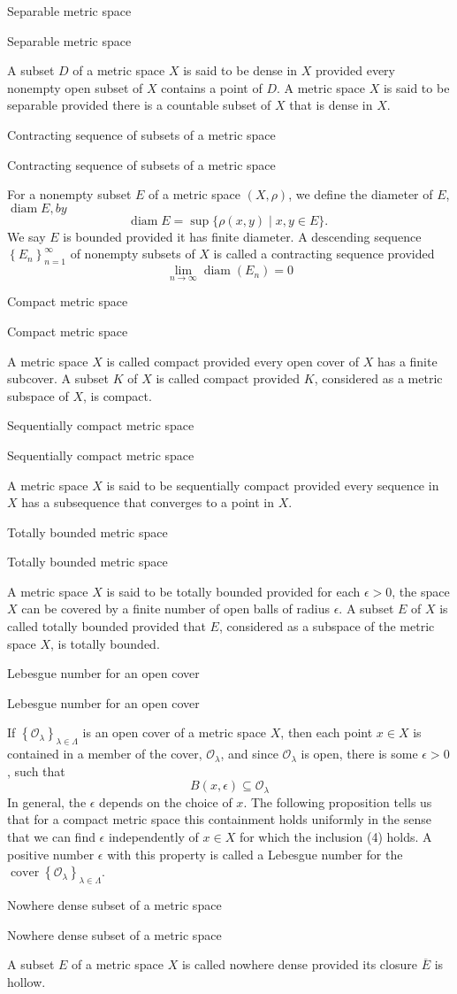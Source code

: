 \documentclass[17pt]{extarticle}
\renewcommand{\bar}[1]{\overline{#1}}
\newcommand{\boxset}[2]{\begin{mdframed}[style=darkQuesion]
#1
\end{mdframed}
\newpage
\begin{mdframed}[style=darkQuesion]
#1
  \end{mdframed}
\begin{mdframed}[style=darkAnswer]
#2
  \end{mdframed}
  \newpage
}
\begin{document}
\boxset{Separable metric space}
{
A subset $D$ of a metric space $X$ is said to be dense in $X$ provided every nonempty open subset of $X$ contains a point of $D$. A metric space $X$ is said to be separable provided there is a countable subset of $X$ that is dense in $X$.
}
\boxset{Contracting sequence of subsets of a metric space}
{
For a nonempty subset $E$ of a metric space $(X, \rho)$, we define the diameter of $E$, $\operatorname{diam} E, b y$
$$
\operatorname{diam} E=\sup \{\rho(x, y) \mid x, y \in E\} \text {. }
$$
We say $E$ is bounded provided it has finite diameter. A descending sequence $\left\{E_{n}\right\}_{n=1}^{\infty}$ of nonempty subsets of $X$ is called a contracting sequence provided
$$
\lim _{n \rightarrow \infty} \operatorname{diam}\left(E_{n}\right)=0
$$
}
\boxset{Compact metric space}
{
A metric space $X$ is called compact provided every open cover of $X$ has a finite subcover. A subset $K$ of $X$ is called compact provided $K$, considered as a metric subspace of $X$, is compact.
}
\boxset{Sequentially compact metric space}
{
A metric space $X$ is said to be sequentially compact provided every sequence in $X$ has a subsequence that converges to a point in $X$.
}
\boxset{Totally bounded metric space}
{
A metric space $X$ is said to be totally bounded provided for each $\epsilon>0$, the space $X$ can be covered by a finite number of open balls of radius $\epsilon.$ A subset $E$ of $X$ is called totally bounded provided that $E$, considered as a subspace of the metric space $X$, is totally bounded.
}
\boxset{Lebesgue number for an open cover}
{
If $\left\{\mathcal{O}_{\lambda}\right\}_{\lambda \in \Lambda}$ is an open cover of a metric space $X$, then each point $x \in X$ is contained in a member of the cover, $\mathcal{O}_{\lambda}$, and since $\mathcal{O}_{\lambda}$ is open, there is some $\epsilon>0$, such that
$$
B(x, \epsilon) \subseteq \mathcal{O}_{\lambda}
$$
In general, the $\epsilon$ depends on the choice of $x$. The following proposition tells us that for a compact metric space this containment holds uniformly in the sense that we can find $\epsilon$ independently of $x \in X$ for which the inclusion (4) holds. A positive number $\epsilon$ with this property is called a Lebesgue number for the $\operatorname{cover}\left\{\mathcal{O}_{\lambda}\right\}_{\lambda \in \Lambda}$.
}
\boxset{Nowhere dense subset of a metric space}
{
A subset $E$ of a metric space $X$ is called nowhere dense provided its closure $\bar{E}$ is hollow.
}
\end{document}
